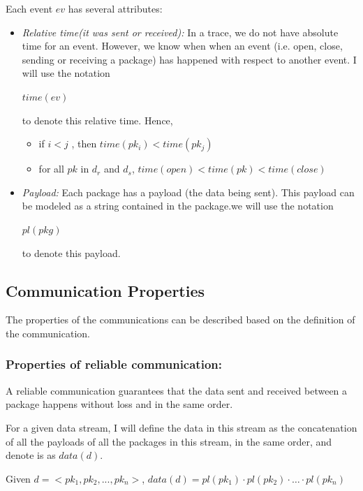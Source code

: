 Each event $ev$ has several attributes:
\begin{itemize}
\item \textit{Relative time(it was sent or received):} In a trace, we do not have absolute time for an event. However, we know when when an event (i.e. open, close, sending or receiving a package) has happened with respect to another event. I will use the notation 

$time(ev)$

to denote this relative time. Hence, 
\begin{itemize}
\item  if  $i < j $ , then  $time(pk_i) < time(pk_j)$

\item  for all $pk$ in $d_r$ and $d_s$, $time(open) < time(pk) < time(close)$
\end{itemize}

\item \textit{Payload:} Each package has a payload (the data being sent). This payload can be modeled as a string contained in the package.we will use the notation 

$pl(pkg)$ 

to denote this payload. 

\end{itemize}


\subsection{Communication Properties}\label{properties}
The properties of the communications can be described based on the definition of the communication.

\subsubsection{Properties of reliable communication:}\label{reliablepro}
A reliable communication guarantees that the data sent and received between a package happens without loss and in the same order.

For a given data stream, I will define the data in this stream as the concatenation of all the payloads of all the packages in this stream, in the same order, and denote is as $data(d)$.

Given $ d = <pk_1, pk_2, ..., pk_n>$, $data(d) = pl(pk_1) \cdot pl(pk_2)\cdot \ldots \cdot pl(pk_n)$


